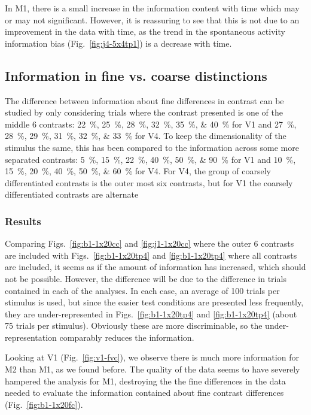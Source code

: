In \ac{M1}, there is a small increase in the information content with time which may or may not significant.
However, it is reassuring to see that this is not due to an improvement in the data with time, as the trend in the spontaneous activity information bias (Fig.~\ref{fig:j4-5x4tp1}) is a decrease with time.


\subsection{Information in fine vs. coarse distinctions}

The difference between information about fine differences in contrast can be studied by only considering trials where the contrast presented is one of the middle 6 contrasts:
\SIlist{22;25;28;32;35;40}{\percent} for \ac{V1} and
\SIlist{27;28;29;31;32;33}{\percent} for \ac{V4}.
To keep the dimensionality of the stimulus the same, this has been compared to the information across some more separated contrasts:
\SIlist{5;15;22;40;50;90}{\percent} for \ac{V1} and
\SIlist{10;15;20;40;50;60}{\percent} for \ac{V4}.
For \ac{V4}, the group of coarsely differentiated contrasts is the outer most six contrasts, but for \ac{V1} the coarsely differentiated contrasts are alternate


\subsubsection{Results}

Comparing Figs.~\ref{fig:b1-1x20cc} and \ref{fig:j1-1x20cc} where the outer 6 contrasts are included with Figs.~\ref{fig:b1-1x20tp4} and \ref{fig:b1-1x20tp4} where all contrasts are included, it seems as if the amount of information has increased, which should not be possible.
However, the difference will be due to the difference in trials contained in each of the analyses.
In each case, an average of 100 trials per stimulus is used, but since the easier test conditions are presented less frequently, they are under-represented in Figs.~\ref{fig:b1-1x20tp4} and \ref{fig:b1-1x20tp4} (about 75 trials per stimulus).
Obviously these are more discriminable, so the under-representation comparably reduces the information.

Looking at \ac{V1} (Fig.~\ref{fig:v1-fvc}), we observe there is much more information for \ac{M2} than \ac{M1}, as we found before.
The quality of the data seems to have severely hampered the analysis for \ac{M1}, destroying the the fine differences in the data needed to evaluate the information contained about fine contrast differences (Fig.~\ref{fig:b1-1x20fc}).

